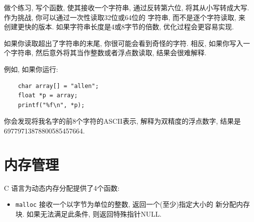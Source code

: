 \documentclass[12pt]{book}
\begin{document}
{%
做个练习, 写个函数, 使其接收一个字符串, 通过反转第六位, 
将其从小写转成大写. 作为挑战, 你可以通过一次性读取32位或64位的
字符串, 而不是逐个字符读取, 来创建更快的版本. 
如果字符串长度是4或8字节的倍数, 优化过程会更容易实现.

如果你读取超出了字符串的末尾, 你很可能会看到奇怪的字符. 
相反, 如果你写入一个字符串, 然后意外将其当作整数或者浮点数读取, 
结果会很难解释.

例如, 如果你运行:

\begin{verbatim}
    char array[] = "allen";
    float *p = array;
    printf("%f\n", *p);
\end{verbatim}

你会发现将我名字的前8个字符的ASCII表示, 解释为双精度的浮点数字, 
结果是69779713878800585457664.



\chapter{内存管理}

C 语言为动态内存分配提供了4个函数:

\begin{itemize}

\item {\tt malloc} 接收一个以字节为单位的整数, 返回一个(至少)指定大小的
新分配内存块. 如果无法满足此条件, 则返回特殊指针NULL.


\end{itemize}}
\end{document}
